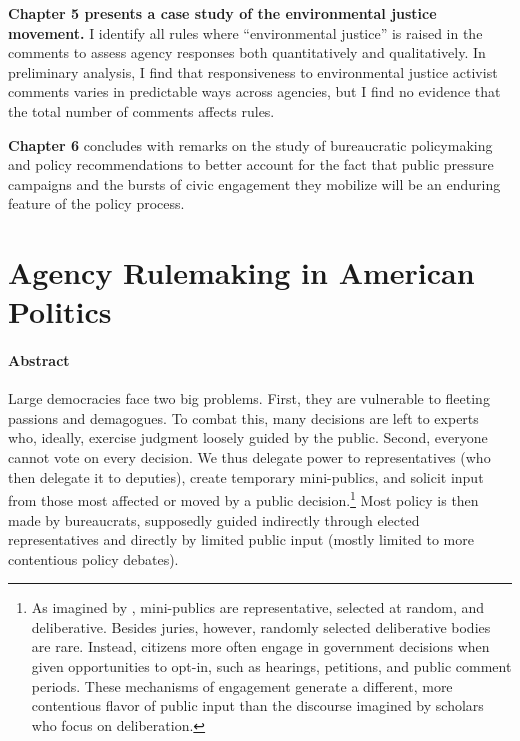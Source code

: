 \documentclass[
]{book}
\begin{document}
\textbf{Chapter 5 presents a case study of the environmental justice movement.} I identify all rules where ``environmental justice'' is raised in the comments to assess agency responses both quantitatively and qualitatively. In preliminary analysis, I find that responsiveness to environmental justice activist comments varies in predictable ways across agencies, but I find no evidence that the total number of comments affects rules.

\textbf{Chapter 6} concludes with remarks on the study of bureaucratic policymaking and policy recommendations to better account for the fact that public pressure campaigns and the bursts of civic engagement they mobilize will be an enduring feature of the policy process.

\hypertarget{agency-rulemaking-in-american-politics}{%
\chapter{Agency Rulemaking in American Politics}\label{agency-rulemaking-in-american-politics}}

\hypertarget{abstract}{%
\subsubsection*{Abstract}\label{abstract}}

Large democracies face two big problems. First, they are vulnerable to fleeting passions and demagogues. To combat this, many decisions are left to experts who, ideally, exercise judgment loosely guided by the public. Second, everyone cannot vote on every decision. We thus delegate power to representatives (who then delegate it to deputies), create temporary mini-publics, and solicit input from those most affected or moved by a public decision.\footnote{As imagined by \citet{Dahl1989}, mini-publics are representative, selected at random, and deliberative. Besides juries, however, randomly selected deliberative bodies are rare. Instead, citizens more often engage in government decisions when given opportunities to opt-in, such as hearings, petitions, and public comment periods. These mechanisms of engagement generate a different, more contentious flavor of public input than the discourse imagined by scholars who focus on deliberation.} Most policy is then made by bureaucrats, supposedly guided indirectly through elected representatives and directly by limited public input (mostly limited to more contentious policy debates).
\end{document}
